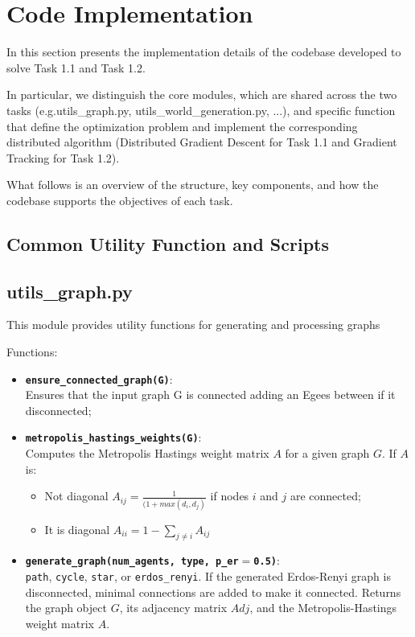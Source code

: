 \section{Code Implementation}


In this section presents the implementation details of the codebase developed to solve Task 1.1 and Task 1.2. 

In particular, we distinguish the core modules, which are shared across the two tasks (e.g.utils\_graph.py, utils\_world\_generation.py, ...), and specific function that define 
the optimization problem and implement the corresponding distributed algorithm (Distributed Gradient Descent for Task 1.1 and Gradient Tracking for Task 1.2). 

What follows is an overview of the structure, key components, and how the codebase supports the objectives of each task.

\subsection{Common Utility Function and Scripts}

\subsection*{\textbf{utils\_graph.py}}
This module provides utility functions for generating and processing graphs 

\noindent Functions: 
\begin{itemize}
    \item \textbf{\texttt{ensure\_connected\_graph(G)}}: \\
    Ensures that the input graph G is connected adding an Egees between if it disconnected; 
    \item \textbf{\texttt{metropolis\_hastings\_weights(G)}}: \\
    Computes the Metropolis Hastings weight matrix $A$ for a given graph $G$. If $A$ is: 
    \begin{itemize}
        \item Not diagonal $A_{ij} = \frac{1}{(1 + max (d_i, d_j)}$ if nodes $i$ and $j$ are connected; 
        \item It is diagonal $A_{ii} = 1 - \sum_{j \not= i} A_{ij} $
    \end{itemize} 
    \item \textbf{\texttt{generate\_graph(num\_agents, type, p\_er$=$0.5)}}:\\
    \texttt{path}, \texttt{cycle}, \texttt{star}, or \texttt{erdos\_renyi}. If the generated Erdos-Renyi graph is disconnected, minimal connections are added to make it connected. 
    Returns the graph object $G$, its adjacency matrix $Adj$, and the Metropolis-Hastings weight matrix $A$.
\end{itemize}

